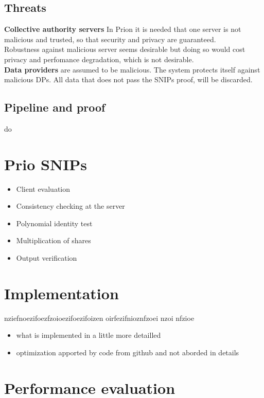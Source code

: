 \documentclass{article}
\begin{document}
\subsection{Threats}
\textbf{Collective authority servers} In Prion it is needed that one server is not malicious and trusted, so that security and privacy are guaranteed.\\
Robustness against malicious server seems desirable but doing so would cost privacy and perfomance degradation, which is not desirable.\\
\textbf{Data providers} are assumed to be malicious. The system protects itself against malicious DPs. All data that does not pass the SNIPs proof, will be discarded.\\

\subsection{Pipeline and proof}
do 
\section*{Prio SNIPs}
\begin{itemize}
\item Client evaluation
\item Consistency checking at the server
\item Polynomial identity test
\item Multiplication of shares
\item Output verification

\end{itemize}


\section{Implementation}
 
 
 nziefnoezifoezfzoioezifoezifoizen oirfezifnioznfzoei nzoi nfzioe
\begin{itemize}

\item what is implemented in a little more detailled
\item optimization apported by code from github and not aborded in details

\end{itemize}


\section{Performance evaluation}
\end{document}
